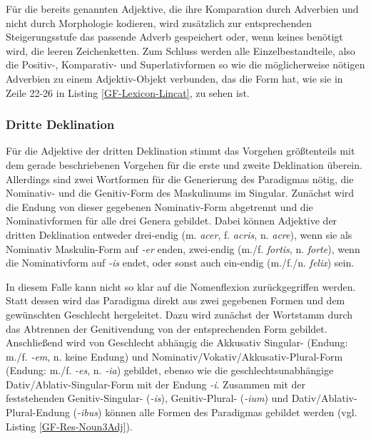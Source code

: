 Für die bereits genannten Adjektive, die ihre Komparation durch Adverbien und nicht durch Morphologie kodieren, wird zusätzlich zur entsprechenden Steigerungsstufe das passende Adverb gespeichert oder, wenn keines benötigt wird, die leeren Zeichenketten. 
Zum Schluss werden alle Einzelbestandteile, also die Positiv-, Komparativ- und Superlativformen so wie die möglicherweise nötigen Adverbien zu einem Adjektiv-Objekt verbunden, das die Form hat, wie sie in Zeile 22-26 in Listing \ref{GF-Lexicon-Lincat}, zu sehen ist.\par
\FloatBarrier
\subsubsection{Dritte Deklination}
Für die Adjektive der dritten Deklination stimmt das Vorgehen größtenteils mit dem gerade beschriebenen Vorgehen für die erste und zweite Deklination überein. Allerdings sind zwei Wortformen für die Generierung des Paradigmas nötig, die Nominativ- und die Genitiv-Form des Maskulinums im Singular. Zunächst wird die Endung von dieser gegebenen Nominativ-Form abgetrennt und die Nominativformen für alle drei Genera gebildet. Dabei können Adjektive der dritten Deklination entweder drei-endig (m. \textit{acer}, f. \textit{acris}, n. \textit{acre}), wenn sie als Nominativ Maskulin-Form auf \textit{-er} enden, zwei-endig (m./f. \textit{fortis}, n. \textit{forte}), wenn die Nominativform auf \textit{-is} endet, oder sonst auch ein-endig (m./f./n. \textit{felix}) sein. \par
In diesem Falle kann nicht so klar auf die Nomenflexion zurückgegriffen werden. Statt dessen wird das Paradigma direkt aus zwei gegebenen Formen und dem gewünschten Geschlecht hergeleitet. Dazu wird zunächst der Wortstamm durch das Abtrennen der Genitivendung von der entsprechenden Form gebildet. Anschließend wird von Geschlecht abhängig die Akkusativ Singular- (Endung: m./f. \textit{-em}, n. keine Endung) und Nominativ/Vokativ/Akkusativ-Plural-Form (Endung: m./f. \textit{-es}, n. \textit{-ia}) gebildet, ebenso wie die geschlechtsunabhängige Dativ/Ablativ-Singular-Form mit der Endung \textit{-i}. Zusammen mit der feststehenden Genitiv-Singular- (\textit{-is}), Genitiv-Plural- (\textit{-ium}) und Dativ/Ablativ-Plural-Endung (\textit{-ibus}) können alle Formen des Paradigmas gebildet werden (vgl. Listing \ref{GF-Res-Noun3Adj}).\par
